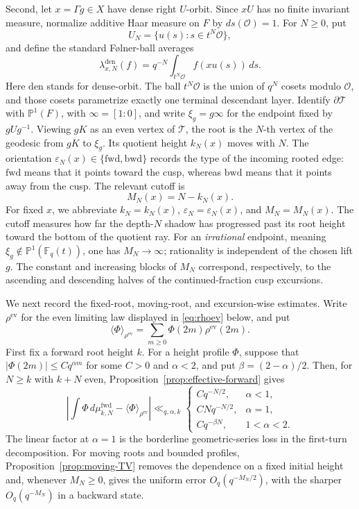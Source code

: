 \documentclass[11pt]{amsart}
\theoremstyle{definition}
\theoremstyle{plain}
\newcommand{\Fq}{\mathbb F_q}
\newcommand{\cO}{\mathcal O}
\newcommand{\Tree}{\mathcal T}
\newcommand{\fwd}{\mathrm{fwd}}
\newcommand{\bwd}{\mathrm{bwd}}
\newcommand{\ev}{\mathrm{ev}}
\newcommand{\ang}{\langle}
\newcommand{\rang}{\rangle}
\begin{document}
Second, let \(x=\Gamma g\in X\) have dense right \(U\)-orbit.  Since \(xU\) has
no finite invariant measure, normalize additive Haar measure on \(F\) by
\(ds(\cO)=1\).  For \(N\ge0\), put
\[
U_N=\{u(s):s\in t^N\cO\},
\]
and define the standard F{\o}lner-ball averages
\[
\lambda_{x,N}^{\mathrm{den}}(f)
  =q^{-N}\int_{t^N\cO}f(xu(s))\,ds.
\]
Here \(\mathrm{den}\) stands for dense-orbit.
The ball \(t^N\cO\) is the union of \(q^N\) cosets modulo \(\cO\), and those
cosets parametrize exactly one terminal descendant layer.  Identify
\(\partial\Tree\) with \(\mathbb P^1(F)\), with \(\infty=[1:0]\), and write
\(\xi_g=g\infty\) for the endpoint fixed by \(gUg^{-1}\).  Viewing \(gK\) as
an even vertex of \(\Tree\), the root is the \(N\)-th vertex of the geodesic
from \(gK\) to \(\xi_g\).
Its quotient height \(k_N(x)\) moves with \(N\).  The orientation
\(\varepsilon_N(x)\in\{\fwd,\bwd\}\) records the type of the incoming rooted
edge: \(\fwd\) means that it points toward the cusp, whereas \(\bwd\) means
that it points away from the cusp.  The relevant cutoff is
\[
M_N(x)=N-k_N(x).
\]
For fixed \(x\), we abbreviate
\(k_N=k_N(x)\), \(\varepsilon_N=\varepsilon_N(x)\), and
\(M_N=M_N(x)\).
The cutoff measures how far the depth-\(N\) shadow has progressed past its root
height toward the bottom of the quotient ray.  For an \emph{irrational}
endpoint, meaning \(\xi_g\notin\mathbb P^1(\Fq(t))\), one has
\(M_N\to\infty\); rationality is independent of the chosen lift \(g\).
The constant and increasing blocks of \(M_N\) correspond, respectively, to
the ascending and descending halves of the continued-fraction cusp excursions.

We next record the fixed-root, moving-root, and excursion-wise estimates.  Write
\(\rho^{\ev}\) for the even limiting law displayed in \eqref{eq:rhoev} below,
and put
\[
\ang\Phi\rang_{\rho^{\ev}}
  =\sum_{m\ge0}\Phi(2m)\rho^{\ev}(2m).
\]
First fix a forward root height \(k\).  For a height profile \(\Phi\), suppose
that \(|\Phi(2m)|\le Cq^{\alpha m}\) for some \(C>0\) and \(\alpha<2\), and put
\(\beta=(2-\alpha)/2\).  Then, for \(N\ge k\) with \(k+N\) even,
Proposition~\ref{prop:effective-forward} gives
\begin{equation}\label{eq:intro-fixed-forward-rates}
\left|\int\Phi\,d\mu^{\fwd}_{k,N}
      -\ang\Phi\rang_{\rho^{\ev}}\right|
\ll_{q,\alpha,k}
\begin{cases}
Cq^{-N/2},&\alpha<1,\\
CNq^{-N/2},&\alpha=1,\\
Cq^{-\beta N},&1<\alpha<2.
\end{cases}
\end{equation}
The linear factor at \(\alpha=1\) is the borderline geometric-series loss in
the first-turn decomposition.  For moving roots and bounded profiles,
Proposition~\ref{prop:moving-TV} removes the dependence on a fixed initial
height and, whenever \(M_N\ge0\), gives the uniform error
\(O_q(q^{-M_N/2})\), with the sharper \(O_q(q^{-M_N})\) in a backward state.
\end{document}
